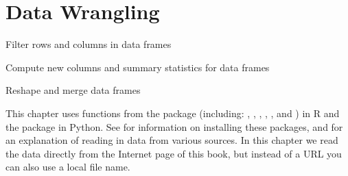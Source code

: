 \chapter{Data Wrangling}
\label{chap:datawrangling}

\begin{abstract}{Abstract}
This chapter shows you how to do `data wrangling' in R and Python.
Data wrangling is the process of transforming raw data into a shape that is suitable for analysis. The sections of this chapter first take you through the normal data wrangling pipeline of
filtering, changing, grouping, and joining data. Finally, the last section shows how you can
reshape data.
\end{abstract}


\begin{objectives}
\item Filter rows and columns in data frames
\item Compute new columns and summary statistics for data frames
\item Reshape and merge data frames
\end{objectives}

\begin{feature}
  This chapter uses functions from the package  (including: , , , , ,  and ) in R and the package  in Python. See  for information on installing these packages, and  for an explanation of reading in data from various sources. In this chapter we read the data directly from the Internet page of this book, but instead of a URL you can also use a local file name.
\end{feature}






